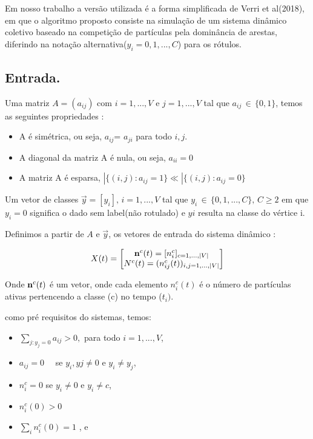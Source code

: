 \documentclass[conference]{IEEEtran}
\begin{document}
 Em nosso trabalho a versão utilizada é a forma simplificada de Verri et al(2018)\cite{b13}, em que o algoritmo proposto  consiste na simulação de um sistema dinâmico coletivo baseado na competição de partículas pela dominância de arestas, diferindo na notação alternativa($y_{i}=0,1,...,C$) para os rótulos.


\subsection{Entrada.}


Uma matriz $A = (a_{ij})$ com $i=1,...,V$ e $j=1,...,V$ tal que $a_{ij} \, \in \, \{0,1\}$, temos as seguintes propriedades : 
\\
\begin{itemize}
\item A é simétrica, ou seja, $a_{ij}$= $a_{ji}$ para todo $i,j$.

\item A diagonal da matriz A é nula, ou seja, $a_{ii} = 0 $
\item A matriz A é esparsa, $|\{(i,j):a_{ij}=1\} \ll |\{(i,j):a_{ij}=0\} $
\end{itemize}

Um vetor de classes $\vec{y}=[y_{i}], \, i=1,...,V$ tal que $y_{i} \, \in \, \{0,1,...,C\}, \, C\geq 2$ em que $y_{i}=0$ significa o dado sem label(não rotulado) e $y{i}$ resulta na classe do vértice i. 

Definimos a partir de  $A$ e $\vec{y}$, os  vetores de entrada do sistema dinâmico :

\begin{equation}
   X(t) = \begin{bmatrix}
       \bold{n}^{c}(t)=[n_{i}^{c}]_{c=1,...,|V|}       \\
       N^{c}(t) = (n_{ij}^{c}(t))_{i,j=1,...,|V|}
     \end{bmatrix} 
\end{equation}

Onde $\bold{n}^{c}(t)$ é um vetor, onde cada elemento ${n}^{c}_{i}(t)$ é o número de partículas ativas pertencendo a classe (c) no tempo ($t_{i})$.  

como pré requisitos do sistemas, temos:
\begin{itemize}
    \item $\displaystyle\sum_{j:y_{j}=0}a_{ij}>0,$ para todo $i=1,...,V$, \newline
    \item $a_{ij}=0\quad$ se $y_{i},y{j}\neq0$ e $y_{i}\neq y_{j}$, \newline
    
    \item $n_{i}^{c}=0$ se $y_{i} \neq 0$ e $y_{i} \neq c$, \newline
    
    \item  $n_{i}^{c}(0)>0$  \newline
    
    \item $\displaystyle\sum_{i}n_{i}^{c}(0)=1$ , e  \newline
\end{itemize}
\end{document}
